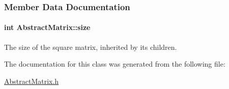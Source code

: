 \subsubsection{Member Data Documentation}
\hypertarget{class_abstract_matrix_aca80e2403cf7903a106595ba56390e99}{
\paragraph[{size}]{\setlength{\rightskip}{0pt plus 5cm}int Abstract\+Matrix\+::size\hspace{0.3cm}{\ttfamily [protected]}}}\label{class_abstract_matrix_aca80e2403cf7903a106595ba56390e99}
The size of the square matrix, inherited by its children. 

The documentation for this class was generated from the following file\+:\begin{DoxyCompactItemize}
\item 
\hyperlink{_abstract_matrix_8h}{Abstract\+Matrix.\+h}\end{DoxyCompactItemize}
